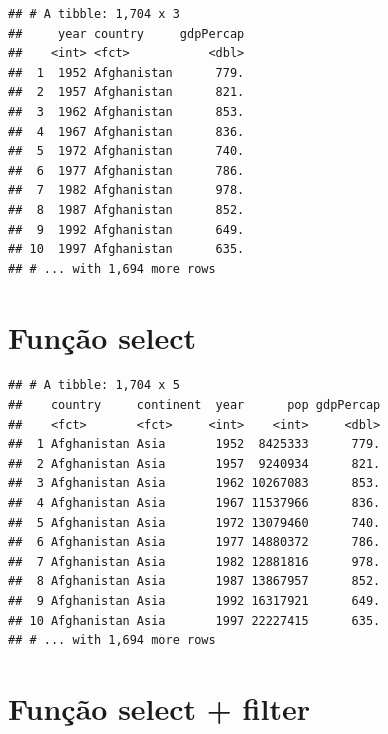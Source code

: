 \documentclass[
]{article}
\newenvironment{Shaded}{\begin{snugshade}}{\end{snugshade}}
\newcommand{\DecValTok}[1]{\textcolor[rgb]{0.00,0.00,0.81}{#1}}
\newcommand{\KeywordTok}[1]{\textcolor[rgb]{0.13,0.29,0.53}{\textbf{#1}}}
\newcommand{\NormalTok}[1]{#1}
\newcommand{\OperatorTok}[1]{\textcolor[rgb]{0.81,0.36,0.00}{\textbf{#1}}}
\newcommand{\StringTok}[1]{\textcolor[rgb]{0.31,0.60,0.02}{#1}}
\begin{document}
\begin{verbatim}
## # A tibble: 1,704 x 3
##     year country     gdpPercap
##    <int> <fct>           <dbl>
##  1  1952 Afghanistan      779.
##  2  1957 Afghanistan      821.
##  3  1962 Afghanistan      853.
##  4  1967 Afghanistan      836.
##  5  1972 Afghanistan      740.
##  6  1977 Afghanistan      786.
##  7  1982 Afghanistan      978.
##  8  1987 Afghanistan      852.
##  9  1992 Afghanistan      649.
## 10  1997 Afghanistan      635.
## # ... with 1,694 more rows
\end{verbatim}

\hypertarget{funuxe7uxe3o-select-1}{%
\section{Função select}\label{funuxe7uxe3o-select-1}}

\begin{Shaded}
\end{Shaded}

\begin{verbatim}
## # A tibble: 1,704 x 5
##    country     continent  year      pop gdpPercap
##    <fct>       <fct>     <int>    <int>     <dbl>
##  1 Afghanistan Asia       1952  8425333      779.
##  2 Afghanistan Asia       1957  9240934      821.
##  3 Afghanistan Asia       1962 10267083      853.
##  4 Afghanistan Asia       1967 11537966      836.
##  5 Afghanistan Asia       1972 13079460      740.
##  6 Afghanistan Asia       1977 14880372      786.
##  7 Afghanistan Asia       1982 12881816      978.
##  8 Afghanistan Asia       1987 13867957      852.
##  9 Afghanistan Asia       1992 16317921      649.
## 10 Afghanistan Asia       1997 22227415      635.
## # ... with 1,694 more rows
\end{verbatim}

\hypertarget{funuxe7uxe3o-select-filter}{%
\section{Função select + filter}\label{funuxe7uxe3o-select-filter}}

\begin{Shaded}
\end{Shaded}
\end{document}
